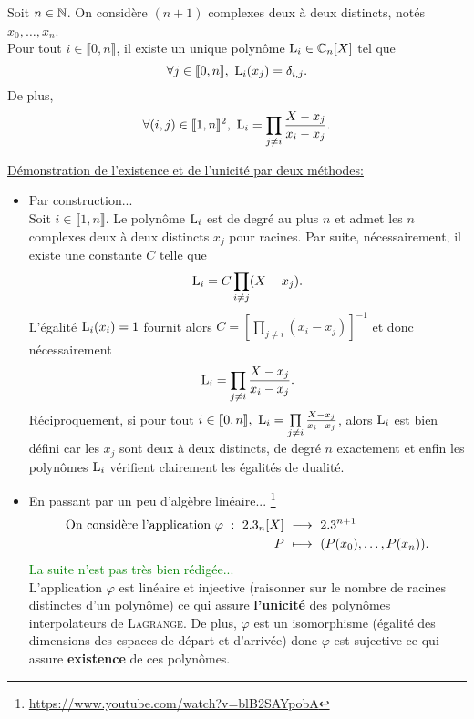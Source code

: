 \begin{defi}
    Soit $n \in \mathbb{N}$. On considère $(n + 1)$ complexes deux à deux distincts, notés $x_0, \dots, x_n$. \\
    Pour tout $i \in \llbracket 0, n \rrbracket$, il existe un unique polynôme $\mathrm{L}_i \in \mathbb{C}_n[X]$ tel que 
    $$\forall j \in \llbracket 0, n \rrbracket,\ \mathrm{L}_i(x_j) = \delta_{i,j}.$$
    De plus,
        $$\forall (i, j) \in \llbracket 1, n \rrbracket^2,\ \mathrm{L}_i = \prod_{j \neq i} \frac{X-x_j}{x_i - x_j}.$$
\end{defi}


\begin{preuve}
\underline{Démonstration de l'existence et de l'unicité par deux méthodes:} 
\begin{itemize}
    \item Par construction...\cite{maths-france} \\
    Soit $i \in \llbracket 1, n \rrbracket$. Le polynôme $\mathrm{L}_i$ est de degré au plus $n$ et admet les $n$ complexes deux à deux distincts $x_j$ pour racines. Par suite, nécessairement, il existe une constante $C$ telle que 
    $$\mathrm{L}_i = C \prod_{i \not= j} (X-x_j).$$
    L'égalité $\mathrm{L}_i(x_i) = 1$ fournit alors $C = \left[ \prod\limits_{j \not=i}(x_i - x_j) \right]^{-1}$ et donc nécessairement
    $$\mathrm{L}_i = \prod_{j \neq i} \frac{X-x_j}{x_i - x_j}.$$
    Réciproquement, si pour tout $i \in \llbracket 0, n\rrbracket,\ \mathrm{L}_i = \prod\limits_{j \neq i} \frac{X-x_j}{x_i - x_j}$, alors $\mathrm{L}_i$ est bien défini car les $x_j$ sont deux à deux distincts, de degré $n$ exactement et enfin les polynômes $\mathrm{L}_i$ vérifient clairement les égalités de dualité.
    \item En passant par un peu d'algèbre linéaire... \footnote{\url{https://www.youtube.com/watch?v=blB2SAYpobA}}
    \begin{alignat*}{2}
        \text{On considère l'application } \varphi\ :\ \R_n[X]\ &\longrightarrow\ \R^{n+1}\\
        P\ &\longmapsto\ (P(x_0), \dots, P(x_n)).
    \end{alignat*}
    \textcolor{green}{La suite n'est pas très bien rédigée...} \\
    L'application $\varphi$ est linéaire et injective (raisonner sur le nombre de racines distinctes d'un polynôme) ce qui assure \textbf{l'unicité} des polynômes interpolateurs de \textsc{Lagrange}. De plus, $\varphi$ est un isomorphisme (égalité des dimensions des espaces de départ et d'arrivée) donc $\varphi$ est sujective ce qui assure \textbf{existence} de ces polynômes. 
\end{itemize}
\end{preuve}

